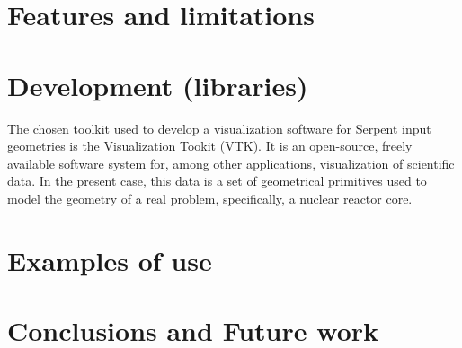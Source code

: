 \documentclass{elsarticle}
\begin{document}

\section{Features and limitations}

\section{Development (libraries)}

The chosen toolkit used to develop a visualization software for Serpent input 
geometries is the Visualization Tookit (VTK)\cite{vtk}. It is an open-source, 
freely available software system for, among other applications, visualization of 
scientific data. In the present case, this data is a set of geometrical 
primitives used to model the geometry of a real problem, specifically, a 
nuclear reactor core.

\section{Examples of use}

\section{Conclusions and Future work}



\end{document}
